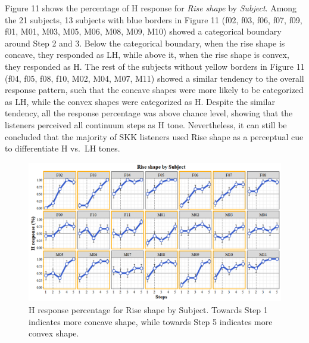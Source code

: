 \documentclass[
  man,floatsintext]{apa6}
\begin{document}
Figure 11 shows the percentage of H response for \emph{Rise shape} by \emph{Subject}. Among the 21 subjects, 13 subjects with blue borders in Figure 11 (f02, f03, f06, f07, f09, f01, M01, M03, M05, M06, M08, M09, M10) showed a categorical boundary around Step 2 and 3. Below the categorical boundary, when the rise shape is concave, they responded as LH, while above it, when the rise shape is convex, they responded as H. The rest of the subjects without yellow borders in Figure 11 (f04, f05, f08, f10, M02, M04, M07, M11) showed a similar tendency to the overall response pattern, such that the concave shapes were more likely to be categorized as LH, while the convex shapes were categorized as H. Despite the similar tendency, all the response percentage was above chance level, showing that the listeners perceived all continuum steps as H tone. Nevertheless, it can still be concluded that the majority of SKK listeners used Rise shape as a perceptual cue to differentiate H vs.~LH tones.

\begin{figure}[H]

{\centering \includegraphics[width=1\linewidth]{images/picture11} 

}

\caption{H response percentage for Rise shape by Subject. Towards Step 1 indicates more concave shape, while towards Step 5 indicates more convex shape. }\label{fig:picture11}
\end{figure}
\end{document}
